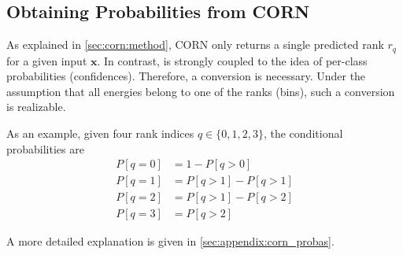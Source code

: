 \subsection{Obtaining Probabilities from CORN} \label{sec:ordinal:corn:probas}
As explained in \autoref{sec:corn:method},
\Ac{CORN} only returns a single predicted rank $r_q$ for a given input $\mathbf{x}$.
In contrast,
\dsea{} is strongly coupled to the idea of per-class probabilities (confidences).
Therefore, a conversion is necessary.
Under the assumption that all energies belong to one of the ranks (bins),
such a conversion is realizable.

As an example, given four rank indices $q \in \{0, 1, 2, 3\}$,
the conditional probabilities are
\begin{align*}
  P[q=0] &= 1 - P[q>0] \\
  P[q=1] &= P[q>1] - P[q>1] \\
  P[q=2] &= P[q>1] - P[q>2] \\
  P[q=3] &= P[q>2]
\end{align*}

A more detailed explanation is given in \autoref{sec:appendix:corn_probas}.


